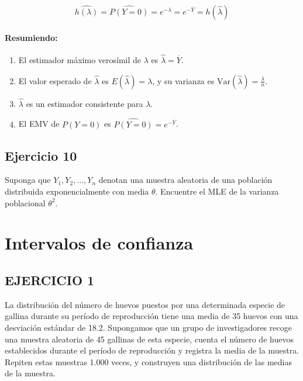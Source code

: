 \documentclass[
]{article}
\providecommand{\tightlist}{%
  \setlength{\itemsep}{0pt}\setlength{\parskip}{0pt}}
\begin{document}
\[
\widehat{h(\lambda)} =
\widehat{P(Y=0)} = e^{-\hat{\lambda}} = e^{-\overline{Y}}=h(\hat\lambda)
\]

\paragraph{Resumiendo:}\label{resumiendo}

\begin{enumerate}
\def\labelenumi{\arabic{enumi}.}
\tightlist
\item
  El estimador máximo verosímil de \(\lambda\) es \(\hat{\lambda} = \overline{Y}\).
\item
  El valor esperado de \(\hat{\lambda}\) es \(E(\hat{\lambda}) = \lambda\), y su varianza es \(\text{Var}(\hat{\lambda}) = \frac{\lambda}{n}\).
\item
  \(\hat{\lambda}\) es un estimador consistente para \(\lambda\).
\item
  El EMV de \(P(Y = 0)\) es \(\widehat{P(Y = 0)} = e^{-\overline{Y}}\).
\end{enumerate}

\subsection{Ejercicio 10}\label{ejercicio-10-1}

Suponga que \(Y_{1}, Y_{2}, \ldots, Y_{n}\) denotan una muestra aleatoria de una población distribuida exponencialmente con media \(\theta\). Encuentre el MLE de la varianza poblacional \(\theta^{2}\).

\section{Intervalos de confianza}\label{intervalos-de-confianza}

\subsection{EJERCICIO 1}\label{ejercicio-1-3}

La distribución del número de huevos puestos por una determinada especie de gallina durante su período de reproducción tiene una media de 35 huevos con una desviación estándar de 18.2. Supongamos que un grupo de investigadores recoge una muestra aleatoria de 45 gallinas de esta especie, cuenta el número de huevos establecidos durante el período de reproducción y registra la media de la muestra. Repiten estas muestras 1.000 veces, y construyen una distribución de las medias de la muestra.
\end{document}
